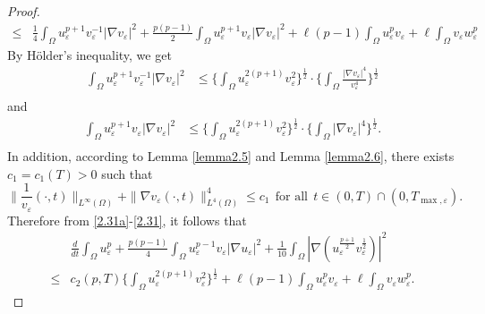\documentclass[12pt]{article}
\theoremstyle{plain}
\theoremstyle{definition}
\numberwithin{equation}{section}
\begin{document}
\begin{proof}
\begin{align}
           \leq & \frac 14 \int_\Omega u_\varepsilon^{p+1}v_\varepsilon^{-1}|\nabla v_\varepsilon|^2 +\frac{p(p-1)}{2}\int_\Omega u_\varepsilon^{p+1}v_\varepsilon|\nabla v_\varepsilon|^2+\ell(p-1)\int_\Omega u_\varepsilon^pv_\varepsilon+\ell\int_\Omega v_\varepsilon w_\varepsilon^{p}\nonumber
    \end{align}
    By H\"{o}lder's inequality, we get
    \begin{equation}\label{2.29}
    \begin{split}
        \int_\Omega u_\varepsilon^{p+1}v_\varepsilon^{-1}|\nabla v_\varepsilon|^2&\leq\bigg\{\int_\Omega u_\varepsilon^{2(p+1)}v_\varepsilon^{2}\bigg\}^{\frac{1}{2}}\cdot\bigg\{\int_\Omega\frac{|\nabla v_\varepsilon|^4}{v_\varepsilon^4}\bigg\}^{\frac{1}{2}}\\
    \end{split}
    \end{equation}
    and
    \begin{equation}\label{2.30}
    \begin{split}
        \int_\Omega u_\varepsilon^{p+1}v_\varepsilon|\nabla v_\varepsilon|^2&\leq\bigg\{\int_\Omega u_\varepsilon^{2(p+1)}v_\varepsilon^2\bigg\}^{\frac{1}{2}}\cdot\bigg\{\int_\Omega|\nabla v_\varepsilon|^4\bigg\}^{\frac{1}{2}}.\\
    \end{split}
    \end{equation}
    In addition, according to Lemma \ref{lemma2.5} and Lemma \ref{lemma2.6},  there exists $c_1=c_1(T)>0$ such that
    \begin{equation}\label{2.31}
        \|\frac{1}{v_\varepsilon}(\cdot,t)\|_{L^\infty(\Omega)} +\|\nabla v_\varepsilon(\cdot,t)\|_{L^4(\Omega)}^4\leq c_1~~\mbox{for all}~~t\in(0,T)\cap(0,T_{\max,\varepsilon}).
    \end{equation}
    Therefore from \eqref{2.31a}-\eqref{2.31},
    it follows that
     \begin{align}\label{2.35a}
           &\frac{d}{dt}\int_\Omega u_\varepsilon^p
           + \frac{p(p-1)}{4}\int_\Omega u_\varepsilon^{p-1}v_\varepsilon|\nabla u_\varepsilon|^2
           +\frac1{10}\int_\Omega|\nabla(u_\varepsilon^{\frac{p+1}{2}}v_\varepsilon^{\frac{1}{2}})|^2           \\
           \leq & c_2(p,T)\bigg\{\int_\Omega u_\varepsilon^{2(p+1)}v_\varepsilon^2\bigg\}^{\frac{1}{2}}
           +\ell(p-1)\int_\Omega u_\varepsilon^pv_\varepsilon+\ell\int_\Omega v_\varepsilon w_\varepsilon^{p}.\nonumber
    \end{align}

\end{proof}
\end{document}
